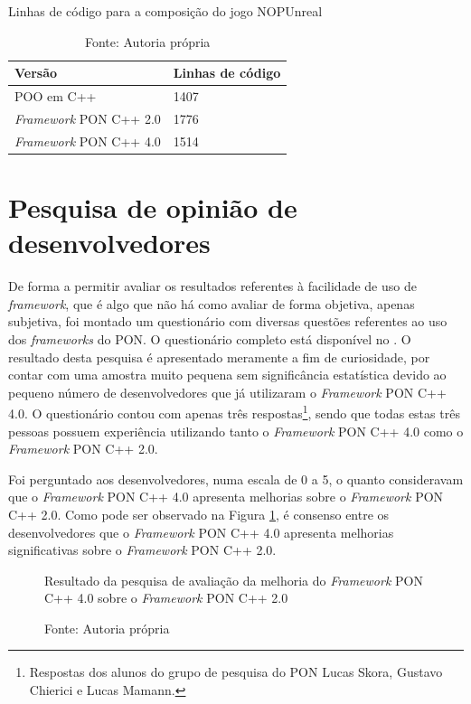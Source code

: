\begin{table}[!htb]
\centering
\caption{Linhas de código para a composição do jogo NOPUnreal}
\smallskip
\begin{tabularx}{0.8\textwidth}{|X|X|}
\hline
Versão & Linhas de código\\
\hline
POO em C++ & 1407 \\
\hline
\textit{Framework} PON C++ 2.0 & 1776 \\
\hline
\textit{Framework} PON C++ 4.0 & 1514 \\
\hline
\end{tabularx}
\caption*{Fonte: Autoria própria}
\label{tab:linhas_de_codigo_nopunreal}
\end{table}

\section{Pesquisa de opinião de desenvolvedores}\label{sec:opiniao}

De forma a permitir avaliar os resultados referentes à facilidade de uso de
\textit{framework}, que é algo que não há como avaliar de forma objetiva, apenas
subjetiva, foi montado um questionário com diversas questões referentes ao uso
dos \textit{frameworks} do PON. O questionário completo está disponível no
. O resultado desta pesquisa é apresentado meramente a
fim de curiosidade, por contar com uma amostra muito pequena sem significância
estatística devido ao pequeno número de desenvolvedores que já utilizaram o
\textit{Framework} PON C++ 4.0. O questionário contou com apenas três
respostas\footnote{Respostas dos alunos do grupo de pesquisa do PON Lucas Skora,
Gustavo Chierici e Lucas Mamann.}, sendo que todas estas três pessoas possuem
experiência utilizando tanto o \textit{Framework} PON C++ 4.0 como o
\textit{Framework} PON C++ 2.0.

Foi perguntado aos desenvolvedores, numa escala de 0 a 5, o quanto consideravam
que o \textit{Framework} PON C++ 4.0 apresenta melhorias sobre o
\textit{Framework} PON C++ 2.0. Como pode ser observado na Figura
\ref{fig:fw_compare}, é consenso entre os desenvolvedores que o
\textit{Framework} PON C++ 4.0 apresenta melhorias significativas sobre o
\textit{Framework} PON C++ 2.0.

\begin{figure}[!htb]
\centering
{}
\caption{Resultado da pesquisa de avaliação da melhoria do \textit{Framework}
PON C++ 4.0 sobre o \textit{Framework} PON C++ 2.0}
\caption*{Fonte: Autoria própria}
\label{fig:fw_compare}
\end{figure}

